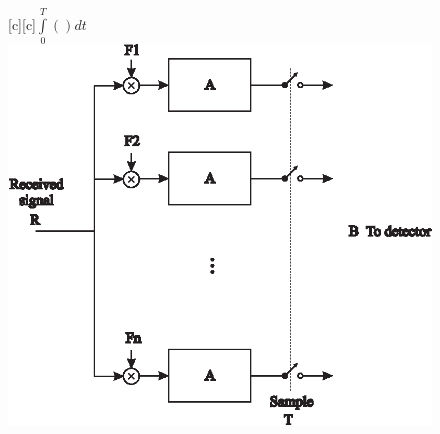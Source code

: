 \documentclass{article}
\begin{document}
\begin{figure}[htb]
  \begin{center}

    [c][c]{$\int\limits_{0}^{T}()dt$}
    \includegraphics{correlation_reciever_psfrag.eps}
    \end{center}
\end{figure}
\end{document}
